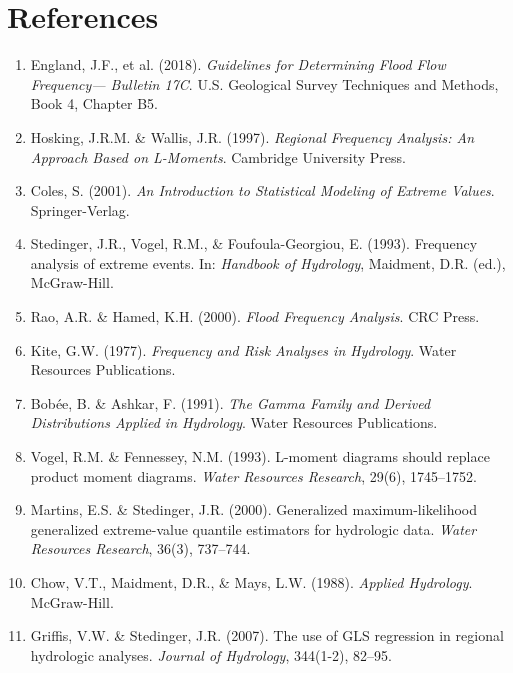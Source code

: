 \documentclass[a4paper, 11pt]{article}
\begin{document}
\section*{References}

\begin{enumerate}
\item England, J.F., et al. (2018). \textit{Guidelines for Determining Flood Flow Frequency—
Bulletin 17C}. U.S. Geological Survey Techniques and Methods, Book 4, Chapter B5.

\item Hosking, J.R.M. \& Wallis, J.R. (1997). \textit{Regional Frequency Analysis: An Approach
Based on L-Moments}. Cambridge University Press.

\item Coles, S. (2001). \textit{An Introduction to Statistical Modeling of Extreme Values}.
Springer-Verlag.

\item Stedinger, J.R., Vogel, R.M., \& Foufoula-Georgiou, E. (1993). Frequency analysis of
extreme events. In: \textit{Handbook of Hydrology}, Maidment, D.R. (ed.), McGraw-Hill.

\item Rao, A.R. \& Hamed, K.H. (2000). \textit{Flood Frequency Analysis}. CRC Press.

\item Kite, G.W. (1977). \textit{Frequency and Risk Analyses in Hydrology}. Water Resources
Publications.

\item Bobée, B. \& Ashkar, F. (1991). \textit{The Gamma Family and Derived Distributions
Applied in Hydrology}. Water Resources Publications.

\item Vogel, R.M. \& Fennessey, N.M. (1993). L-moment diagrams should replace product moment
diagrams. \textit{Water Resources Research}, 29(6), 1745--1752.

\item Martins, E.S. \& Stedinger, J.R. (2000). Generalized maximum-likelihood generalized
extreme-value quantile estimators for hydrologic data. \textit{Water Resources Research},
36(3), 737--744.

\item Chow, V.T., Maidment, D.R., \& Mays, L.W. (1988). \textit{Applied Hydrology}.
McGraw-Hill.

\item Griffis, V.W. \& Stedinger, J.R. (2007). The use of GLS regression in regional hydrologic
analyses. \textit{Journal of Hydrology}, 344(1-2), 82--95.


\end{enumerate}
\end{document}
